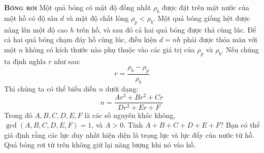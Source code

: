 \begin{problem}
{\textbf{\textsc{Bóng rơi}}} Một quả bóng có mật độ đồng nhất \( \rho_b \) được đặt trên mặt nước của một hồ có độ sâu \( d \) và mật độ chất lỏng \( \rho_p < \rho_b \). Một quả bóng giống hệt được nâng lên một độ cao \( h \) trên hồ, và sau đó cả hai quả bóng được thả cùng lúc. Để cả hai quả bóng chạm đáy hồ cùng lúc, điều kiện \( d = nh \) phải được thỏa mãn với một \( n \) không có kích thước nào phụ thuộc vào các giá trị của \( \rho_p \) và \( \rho_b \). Nếu chúng ta định nghĩa \( r \) như sau:
$$r = \frac{\rho_b - \rho_p}{\rho_b}$$
Thì chúng ta có thể biểu diễn \( n \) dưới dạng:
$$n = \frac{Ar^3 + Br^2 + Cr}{Dr^2+Er+F}$$
Trong đó $A, B, C, D, E, F$ là các số nguyên khác không, $\gcd(A,B,C,D,E,F) = 1$, và $A>0$. Tính $A + B + C + D + E + F$?
Bạn có thể giả định rằng các lực duy nhất hiện diện là trọng lực và lực đẩy của nước từ hồ. Quả bóng rơi từ trên không giữ lại năng lượng khi nó vào hồ.
\end{problem}
